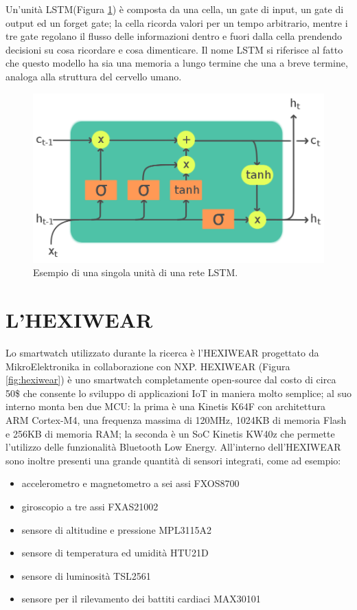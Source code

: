 Un'unità LSTM(Figura \ref{fig:lstm}) è composta da una cella, un gate di input, un gate di output ed un forget gate; la cella ricorda valori per un tempo arbitrario, mentre i tre gate regolano il flusso delle informazioni dentro e fuori dalla cella prendendo decisioni su cosa ricordare e cosa dimenticare. Il nome LSTM si riferisce al fatto che questo modello ha sia una memoria a lungo termine che una a breve termine, analoga alla struttura del cervello umano.

\begin{figure}[!htb]
    \centering
    \includegraphics[width=.5\textwidth]{figure/lstm.png}
    \caption{Esempio di una singola unità di una rete LSTM.}
    \label{fig:lstm}
\end{figure}

\section{L'HEXIWEAR}
\label{sec:hexiwear}

Lo smartwatch utilizzato durante la ricerca è l’HEXIWEAR progettato da MikroElektronika in collaborazione con NXP. HEXIWEAR (Figura \ref{fig:hexiwear}) è uno smartwatch completamente open-source dal costo di circa 50\$ che consente lo sviluppo di applicazioni IoT in maniera molto semplice; al suo interno monta ben due MCU: la prima è una Kinetis K64F con architettura ARM Cortex-M4, una frequenza massima di 120MHz, 1024KB di memoria Flash e 256KB di memoria RAM; la seconda è un SoC Kinetis KW40z che permette l’utilizzo delle funzionalità Bluetooth Low Energy. 
All'interno dell'HEXIWEAR sono inoltre presenti una grande quantità di sensori integrati, come ad esempio: 

\begin{itemize}
    \item accelerometro e magnetometro a sei assi FXOS8700
    \item giroscopio a tre assi FXAS21002
    \item sensore di altitudine e pressione MPL3115A2
    \item sensore di temperatura ed umidità HTU21D
    \item sensore di luminosità TSL2561
    \item sensore per il rilevamento dei battiti cardiaci MAX30101
\end{itemize}

